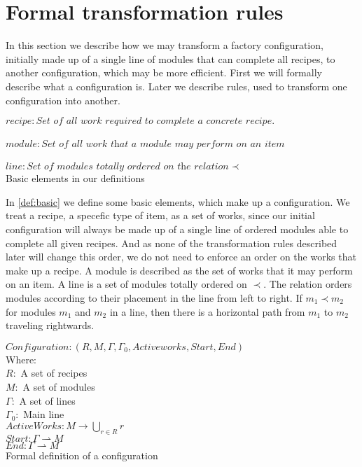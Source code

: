 \section{Formal transformation rules} \label{sec:math_rules}
In this section we describe how we may transform a factory configuration, initially made up of a single line of modules that can complete all recipes, to another configuration, which may be more efficient. First we will formally describe what a configuration is. Later we describe rules, used to transform one configuration into another.

\begin{definition}[htb]
$recipe: \textit{Set of all work required to complete a concrete recipe.}$
\\ \\
$module: \textit{Set of all work that a module may perform on an item}$
\\ \\
$line: \textit{Set of modules totally ordered on the relation} \prec$
\\
\caption{Basic elements in our definitions}
\label{def:basic}
\end{definition}


In \cref{def:basic} we define some basic elements, which make up a configuration. We treat a recipe, a specefic type of item, as a set of works, since our initial configuration will always be made up of a single line of ordered modules able to complete all given recipes. And as none of the transformation rules described later will change this order, we do not need to enforce an order on the works that make up a recipe. A module is described as the set of works that it may perform on an item. A line is a set of modules totally ordered on $\prec$. The relation orders modules according to their placement in the line from left to right. If $m_1 \prec m_2$ for modules $m_1$ and $m_2$ in a line, then there is a horizontal path from $m_1$ to $m_2$ traveling rightwards. 

\begin{definition}[htb]
$Configuration: (R, M , \Gamma, \Gamma_0, Activeworks, Start, End)$
\\
Where: \\
$R:$ A set of recipes \\
$M:$ A set of modules \\
$\Gamma:$ A set of lines \\
$\Gamma_0:$ Main line \\
$ActiveWorks: M \rightarrow \bigcup_{r\in R}r$ \\ 
$Start: \Gamma \rightharpoonup M$ \\
$End: \Gamma \rightharpoonup M$ \\
\caption{Formal definition of a configuration}
\label{def:config}
\end{definition}


